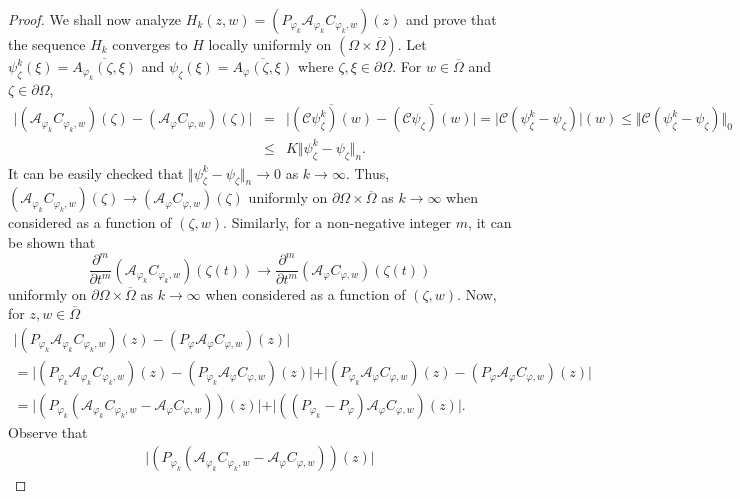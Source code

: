 \documentclass[10pt,a4paper]{amsart}
\begin{document}
\begin{proof}
\medskip

We shall now analyze $H_k(z,w)=(P_{\varphi_k} \mathcal{A}_{\varphi_k} C_{\varphi_k,w})(z)$ and prove that the sequence $H_k$ converges to $H$ locally uniformly on $(\Omega\times\overline{\Omega})$. Let $\psi_{\zeta}^k(\xi)=\overline{A_{\varphi_k}(\zeta,\xi)}$ and $\psi_{\zeta}(\xi)=\overline{A_{\varphi}(\zeta,\xi)}$ where $\zeta,\xi\in\partial\Omega$. For $w\in\overline{\Omega}$ and $\zeta\in\partial\Omega$,
\begin{eqnarray*}
\vert(\mathcal{A}_{\varphi_k}C_{\varphi_k,w})(\zeta)-(\mathcal{A}_{\varphi}C_{\varphi,w})(\zeta)\vert 
&=&
\vert\overline{(\mathcal{C}\psi^k_{\zeta})(w)}-\overline{(\mathcal{C}\psi_{\zeta})(w)}\vert
=
\vert\mathcal{C}(\psi^k_{\zeta}-\psi_{\zeta})\vert(w)
\leq
\Vert\mathcal{C}(\psi^k_{\zeta}-\psi_{\zeta})\Vert_0\\
&\leq&
K\Vert \psi^k_{\zeta}-\psi_{\zeta}\Vert_n.
\end{eqnarray*}
It can be easily checked that $\Vert \psi^k_{\zeta}-\psi_{\zeta}\Vert_n\rightarrow 0$ as $k\rightarrow\infty$. Thus, $(\mathcal{A}_{\varphi_k}C_{\varphi_k,w})(\zeta)\rightarrow (\mathcal{A}_{\varphi}C_{\varphi,w})(\zeta)$ uniformly on $\partial\Omega\times \overline{\Omega}$ as $k\rightarrow\infty$ when considered as a function of $(\zeta,w)$. Similarly, for a non-negative integer $m$, it can be shown that
\[
\frac{\partial^m}{\partial t^m} (\mathcal{A}_{\varphi_k}C_{\varphi_k,w})(\zeta(t))
\rightarrow
\frac{\partial^m}{\partial t^m}(\mathcal{A}_{\varphi}C_{\varphi,w})(\zeta(t))
\]
uniformly on $\partial\Omega\times \overline{\Omega}$ as $k\rightarrow\infty$ when considered as a function of $(\zeta,w)$. Now, for $z,w\in\overline{\Omega}$
\begin{multline*}
\vert (P_{\varphi_k}\mathcal{A}_{\varphi_k} C_{\varphi_k,w})(z)-(P_{\varphi}\mathcal{A}_{\varphi} C_{\varphi,w})(z)\vert
\\
=
\vert (P_{\varphi_k}\mathcal{A}_{\varphi_k} C_{\varphi_k,w})(z)-(P_{\varphi_k}\mathcal{A}_{\varphi} C_{\varphi,w})(z)\vert 
+
\vert (P_{\varphi_k}\mathcal{A}_{\varphi} C_{\varphi,w})(z)-(P_{\varphi}\mathcal{A}_{\varphi} C_{\varphi,w})(z)\vert\\
=
\vert (P_{\varphi_k}(\mathcal{A}_{\varphi_k} C_{\varphi_k,w}-\mathcal{A}_{\varphi} C_{\varphi,w}))(z)\vert 
+
\vert ((P_{\varphi_k}-P_{\varphi})\mathcal{A}_{\varphi} C_{\varphi,w})(z)\vert.
\end{multline*}
Observe that
\begin{eqnarray*}
\vert (P_{\varphi_k}(\mathcal{A}_{\varphi_k} C_{\varphi_k,w}-\mathcal{A}_{\varphi} C_{\varphi,w}))(z)\vert 

\end{eqnarray*}
\end{proof}
\end{document}
